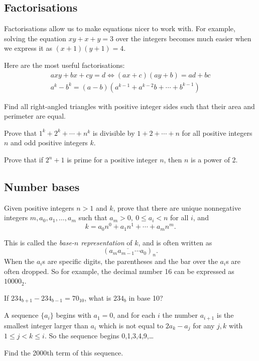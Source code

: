 \subsection{Factorisations}
Factorisations allow us to make equations nicer to work with. For example,
solving the equation $xy+x+y=3$ over the integers becomes much easier when we
express it as $(x+1)(y+1)=4$.

Here are the most useful factorisations:
\begin{align*}
  axy+bx+cy=d\iff (ax+c)(ay+b)=ad+bc \\
  a^k-b^k=(a-b)\left(a^{k-1}+a^{k-2}b+\cdots+b^{k-1}\right)
\end{align*}
\begin{problem}{\label{p:b:n:f:1}}
     Find all right-angled triangles with positive integer sides 
      such that their area and perimeter are equal.
\end{problem}
\begin{problem}{\label{p:b:n:f:2}}
     Prove that $1^k+2^k+\cdots+n^k$ is divisible by $1+2+\cdots+n$ for
      all positive integers $n$ and odd positive integers $k$.
\end{problem}
\begin{problem}{\label{p:b:n:f:3}}
    Prove that if $2^n+1$ is prime for a positive integer $n$, then $n$ is
      a power of 2.
\end{problem}
\subsection{Number bases}\label{b:n:bases}
\begin{result}{\label{r:b:n:b:1}}
    Given positive integers $n>1$ and $k$, prove that there are unique
      nonnegative integers $m,a_0,a_1,\ldots,a_m$ such that $a_m>0,\ 0\le
      a_i<n$ for all $i$, and
      \[k=a_0 n^0+a_1 n^1+\cdots+a_m n^m.\]
\end{result}
This is called the \emph{base-$n$ representation} of $k$, and is often written
as
\[(\overline{a_m a_{m-1}\cdots a_0})_n.\]
When the $a_i$s are specific digits, the parentheses and the bar over the $a_i$s
are often dropped. So for example, the decimal number 16 can be expressed as
$10000_2$.
\begin{problem}{\label{p:b:n:b:1}}
   If $234_{b+1}-234_{b-1}=70_{10}$, what is $234_b$ in base 10?
\end{problem}
\begin{problem}{\label{p:b:n:b:2}}
  A sequence $\{a_i\}$ begins with $a_1=0$, and for each $i$ the number
    $a_{i+1}$ is the smallest integer larger than $a_i$ which is not
    equal to $2a_k-a_j$ for any $j,k$ with $1\le j<k\le i$. So the sequence begins
    0,1,3,4,9,\ldots

    Find the 2000th term of this sequence.
\end{problem}
